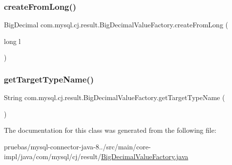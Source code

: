 \subsubsection{\texorpdfstring{create\+From\+Long()}{createFromLong()}}
{\footnotesize\ttfamily Big\+Decimal com.\+mysql.\+cj.\+result.\+Big\+Decimal\+Value\+Factory.\+create\+From\+Long (\begin{DoxyParamCaption}\item[{long}]{l }\end{DoxyParamCaption})}

\mbox{\label{classcom_1_1mysql_1_1cj_1_1result_1_1_big_decimal_value_factory_a1d7ae8a6ba7ab702d6bc4a30c9f66bd5}} 
\subsubsection{\texorpdfstring{get\+Target\+Type\+Name()}{getTargetTypeName()}}
{\footnotesize\ttfamily String com.\+mysql.\+cj.\+result.\+Big\+Decimal\+Value\+Factory.\+get\+Target\+Type\+Name (\begin{DoxyParamCaption}{ }\end{DoxyParamCaption})}



The documentation for this class was generated from the following file\+:\begin{DoxyCompactItemize}
\item 
pruebas/mysql-\/connector-\/java-\/8../src/main/core-\/impl/java/com/mysql/cj/result/\mbox{\hyperlink{_big_decimal_value_factory_8java}{Big\+Decimal\+Value\+Factory.\+java}}\end{DoxyCompactItemize}
